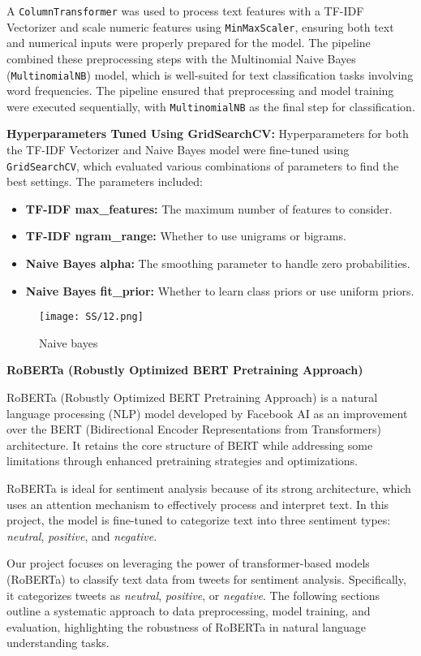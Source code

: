 \documentclass[journal]{IEEEtran}
\begin{document}
A \texttt{ColumnTransformer} was used to process text features with a TF-IDF Vectorizer and scale numeric features using \texttt{MinMaxScaler}, ensuring both text and numerical inputs were properly prepared for the model. The pipeline combined these preprocessing steps with the Multinomial Naive Bayes (\texttt{MultinomialNB}) model, which is well-suited for text classification tasks involving word frequencies. The pipeline ensured that preprocessing and model training were executed sequentially, with \texttt{MultinomialNB} as the final step for classification.

\textbf{Hyperparameters Tuned Using GridSearchCV:}
Hyperparameters for both the TF-IDF Vectorizer and Naive Bayes model were fine-tuned using \texttt{GridSearchCV}, which evaluated various combinations of parameters to find the best settings. The parameters included:
\begin{itemize}
    \item \textbf{TF-IDF max\_features:} The maximum number of features to consider.
    \item \textbf{TF-IDF ngram\_range:} Whether to use unigrams or bigrams.
    \item \textbf{Naive Bayes alpha:} The smoothing parameter to handle zero probabilities.
    \item \textbf{Naive Bayes fit\_prior:} Whether to learn class priors or use uniform priors.
\end{itemize}
\begin{figure}[H]
\centering
\texttt{[image: SS/12.png]}
\caption{Naive bayes}
\end{figure}

\textbf{RoBERTa (Robustly Optimized BERT Pretraining Approach)}

RoBERTa (Robustly Optimized BERT Pretraining Approach) is a natural language processing (NLP) model developed by Facebook AI as an improvement over the BERT (Bidirectional Encoder Representations from Transformers) architecture. It retains the core structure of BERT while addressing some limitations through enhanced pretraining strategies and optimizations.

RoBERTa is ideal for sentiment analysis because of its strong architecture, which uses an attention mechanism to effectively process and interpret text. In this project, the model is fine-tuned to categorize text into three sentiment types: \textit{neutral}, \textit{positive}, and \textit{negative}.

Our project focuses on leveraging the power of transformer-based models (RoBERTa) to classify text data from tweets for sentiment analysis. Specifically, it categorizes tweets as \textit{neutral}, \textit{positive}, or \textit{negative}. The following sections outline a systematic approach to data preprocessing, model training, and evaluation, highlighting the robustness of RoBERTa in natural language understanding tasks.
\end{document}
